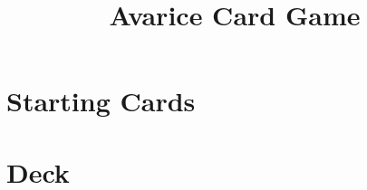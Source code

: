 \documentclass[letterpaper,landscape]{article}
\title{Avarice Card Game}
\begin{document}
	\sffamily
	\pagestyle{empty}
    
    \pagebreak
    \section{Starting Cards}
    \begin{multicols}{4}
    \setlength{\columnsep}{1mm}
    
    \end{multicols}
    \section{Deck}
    \begin{multicols}{4}
    \setlength{\columnsep}{1mm}
    
    \end{multicols}
\end{document}

